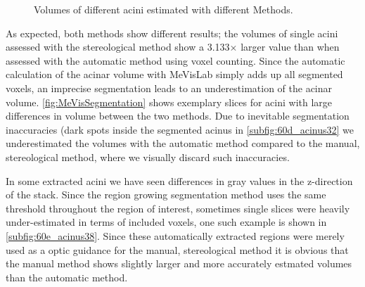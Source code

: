\documentclass[%
	twoside,
	paper=a4,%
	abstract=true,%
	]{scrartcl}
\newcommand{\imsize}{\linewidth}
\begin{document}
\begin{figure}[htb]
	\caption{Volumes of different acini estimated with different Methods.}
	\label{fig:VolumeMeVisVsSTEPanizer}%
\end{figure}

As expected, both methods show different results; the volumes of single acini assessed with the stereological method show a 3.133\(\times\) larger value than when assessed with the automatic method using voxel counting. Since the automatic calculation of the acinar volume with MeVisLab simply adds up all segmented voxels, an imprecise segmentation leads to an underestimation of the acinar volume. \autoref{fig:MeVisSegmentation} shows exemplary slices for acini with large differences in volume between the two methods. Due to inevitable segmentation inaccuracies (dark spots inside the segmented acinus in \autoref{subfig:60d_acinus32} we underestimated the volumes with the automatic method compared to the manual, stereological method, where we visually discard such inaccuracies.

In some extracted acini we have seen differences in gray values in the z-direction of the stack. Since the region growing segmentation method uses the same threshold throughout the region of interest, sometimes single slices were heavily under-estimated in terms of included voxels, one such example is shown in \autoref{subfig:60e_acinus38}. Since these automatically extracted regions were merely used as a optic guidance for the manual, stereological method it is obvious that the manual method shows slightly larger and more accurately estmated volumes than the automatic method.
\end{document}
